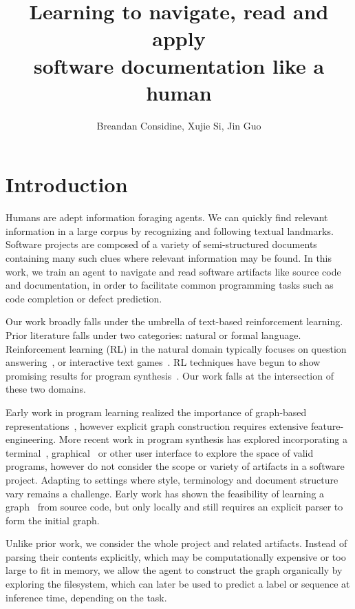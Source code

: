 \documentclass[11pt]{article}
\title{Learning to navigate, read and apply\\software documentation like a human}
\author{Breandan Considine, Xujie Si, Jin Guo}
\begin{document}
\maketitle

\section{Introduction}

Humans are adept information foraging agents. We can quickly find relevant information in a large corpus by recognizing and following textual landmarks. Software projects are composed of a variety of semi-structured documents containing many such clues where relevant information may be found. In this work, we train an agent to navigate and read software artifacts like source code and documentation, in order to facilitate common programming tasks such as code completion or defect prediction.

Our work broadly falls under the umbrella of text-based reinforcement learning. Prior literature falls under two categories: natural or formal language. Reinforcement learning (RL) in the natural domain typically focuses on question answering~\cite{buck2017ask, chen2019reinforcement}, or interactive text games~\cite{he2015deep,ammanabrolu2018playing,narasimhan2015language,guo2020interactive,ammanabrolu2020graph}. RL techniques have begun to show promising results for program synthesis~\cite{ellis2019write, johnson2020learning, chen2020program}. Our work falls at the intersection of these two domains.

Early work in program learning realized the importance of graph-based representations~\cite{allamanis2017learning}, however explicit graph construction requires extensive feature-engineering. More recent work in program synthesis has explored incorporating a terminal~\cite{ellis2019write}, graphical~\cite{walke2020learning} or other user interface to explore the space of valid programs, however do not consider the scope or variety of artifacts in a software project. Adapting to settings where style, terminology and document structure vary remains a challenge. Early work has shown the feasibility of learning a graph~\cite{johnson2020learning} from source code, but only locally and still requires an explicit parser to form the initial graph.

Unlike prior work, we consider the whole project and related artifacts. Instead of parsing their contents explicitly, which may be computationally expensive or too large to fit in memory, we allow the agent to construct the graph organically by exploring the filesystem, which can later be used to predict a label or sequence at inference time, depending on the task.
\end{document}
